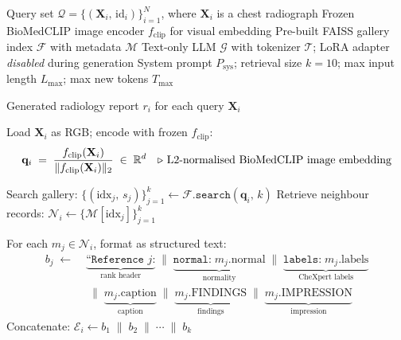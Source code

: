 \documentclass[12pt]{article}
\begin{document}
\setcounter{algorithm}{3}

\begin{algorithm}[H]
\small
\caption{Multimodal Retrieval-Augmented Generation for CXR Report (Image-guided retrieval + LLM)}
\begin{algorithmic}[1]

\Require Query set $\mathcal{Q} = \{(\mathbf{X}_i,\, \text{id}_i)\}_{i=1}^{N}$, where $\mathbf{X}_i$ is a chest radiograph
\Require Frozen BioMedCLIP image encoder $f_{\text{clip}}$ for visual embedding
\Require Pre-built FAISS gallery index $\mathcal{F}$ with metadata $\mathcal{M}$
\Require Text-only LLM $\mathcal{G}$ with tokenizer $\mathcal{T}$; LoRA adapter \textit{disabled} during generation
\Require System prompt $P_{\text{sys}}$; retrieval size $k{=}10$; max input length $L_{\max}$; max new tokens $T_{\max}$

\Ensure Generated radiology report $r_i$ for each query $\mathbf{X}_i$


    \State Load $\mathbf{X}_i$ as RGB; encode with frozen $f_{\text{clip}}$:
    \[
        \mathbf{q}_i \;=\; \frac{f_{\text{clip}}(\mathbf{X}_i)}{\|f_{\text{clip}}(\mathbf{X}_i)\|_2}
        \;\in\;\mathbb{R}^{d}
        \quad \text{\Comment{L2-normalised BioMedCLIP image embedding}}
    \]

    \State Search gallery: $\{(\text{idx}_j,\, s_j)\}_{j=1}^{k} \gets \mathcal{F}.\texttt{search}(\mathbf{q}_i,\, k)$
    \State Retrieve neighbour records: $\mathcal{N}_i \gets \{\mathcal{M}[\text{idx}_j]\}_{j=1}^{k}$

    \State For each $m_j \in \mathcal{N}_i$, format as structured text:
    \begin{align*}
        b_j \;\gets\; &
        \underbrace{\texttt{``Reference }j\texttt{:}}_{\text{rank header}}
        \;\|\;
        \underbrace{\texttt{normal:}\;m_j.\text{normal}}_{\text{normality}}
        \;\|\;
        \underbrace{\texttt{labels:}\;m_j.\text{labels}}_{\text{CheXpert labels}} \\
        &\;\|\;
        \underbrace{m_j.\text{caption}}_{\text{caption}}
        \;\|\;
        \underbrace{m_j.\text{FINDINGS}}_{\text{findings}}
        \;\|\;
        \underbrace{m_j.\text{IMPRESSION}}_{\text{impression}}
    \end{align*}
    \State Concatenate: $\mathcal{E}_i \gets b_1 \;\|\; b_2 \;\|\; \cdots \;\|\; b_k$


\end{algorithmic}
\end{algorithm}
\end{document}
